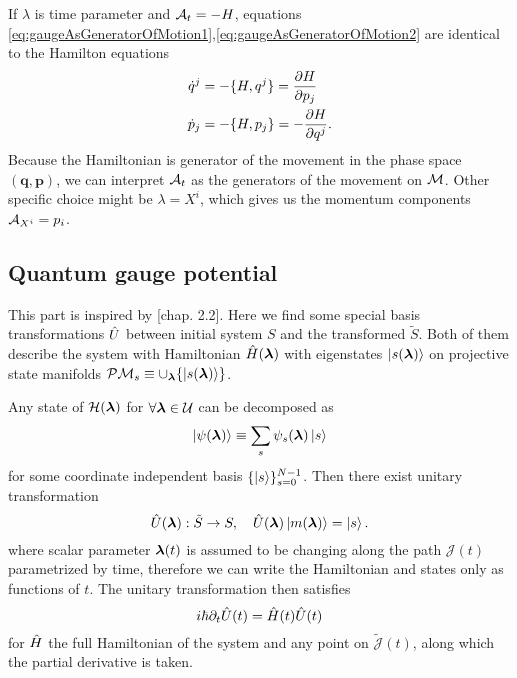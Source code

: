 If $\lambda$ is time parameter and $\mathcal{A}_t=-H$, equations \ref{eq:gaugeAsGeneratorOfMotion1},\ref{eq:gaugeAsGeneratorOfMotion2} are identical to the Hamilton equations
\begin{equation}
\begin{split}
    \dot{q}^j&=-\{H,q^j\} = \frac{\partial H}{\partial p_j}\\
    \dot{p}_j&=-\{H,p_j\} = -\frac{\partial H}{\partial q^j}.
\end{split}
\end{equation}
Because the Hamiltonian is generator of the movement in the phase space $(\bm{q},\bm{p})$, we can interpret $\mathcal{A}_t$ as the generators of the movement on $\mathcal{M}$. Other specific choice might be $\lambda=X^i$, which gives us the momentum components $\mathcal{A}_{X^i}=p_i$.



\subsection{Quantum gauge potential}
This part is inspired by \citet{kolodrubez}[chap. 2.2].
Here we find some special basis transformations $\hat{U}$ between initial system $S$ and the transformed $\tilde{S}$. Both of them describe the system with Hamiltonian $\hat{H}({\bm\lambda})$ with eigenstates $\ket{s({\bm\lambda})}$ on projective state manifolds $\mathcal{P}\mathcal{M}_s\equiv \cup_{\bm\lambda} \{\ket{s({\bm\lambda})}\}$. 

Any state of $\mathcal{H}({\bm\lambda})$ for $\forall {\bm\lambda}\in \mathcal U$ can be decomposed as
    \begin{equation}
    \ket{\psi({\bm\lambda})}\equiv \sum_s \psi_s({\bm\lambda})\ket{s}
\end{equation}    
for some coordinate independent basis $\{\ket{s}\}_{s=0}^{N-1}$.
Then there exist unitary transformation
\begin{equation}
    \hat{U}({\bm\lambda}): \tilde S\rightarrow S,\quad \hat{U}({\bm\lambda})\ket{m({\bm\lambda})}=\ket{s}.
    \label{eq:transformationU}
\end{equation}
where scalar parameter ${\bm\lambda}(t)$ is assumed to be changing along the path $\mathcal J(t)$ parametrized by time, therefore we can write the Hamiltonian and states only as functions of $t$. The unitary transformation then satisfies
\begin{equation}
    i\hbar \partial_t \hat{U}(t)=\hat{H}(t)\hat{U}(t)
    \label{eq:schrodingerForU}
\end{equation}
for $\hat{H}$ the full Hamiltonian of the system and any point on $\tilde{\mathcal J}(t)$, along which the partial derivative is taken.



